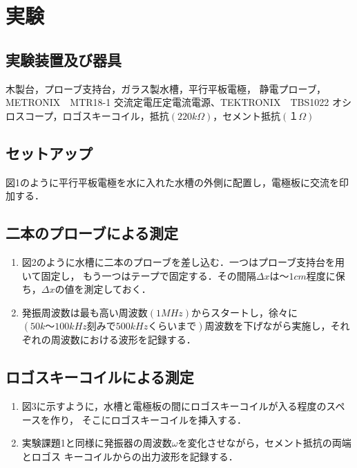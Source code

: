 
\section{実験}

\subsection{実験装置及び器具}
木製台，プローブ支持台，ガラス製水槽，平行平板電極，
静電プローブ，METRONIX　MTR18-1 交流定電圧定電流電源、TEKTRONIX　TBS1022
オシロスコープ，ロゴスキーコイル，抵抗$(220\si{k\Omega})$，セメント抵抗$(１\si{\Omega})$

\subsection{セットアップ}
図1のように平行平板電極を水に入れた水槽の外側に配置し，電極板に交流を印加する．

\subsection{二本のプローブによる測定}
\begin{enumerate}
    \item 図2のように水槽に二本のプローブを差し込む．一つはプローブ支持台を用いて固定し，
    もう一つはテープで固定する．その間隔$\Delta x$は～$1\si{cm}$程度に保ち，$\Delta x$の値を測定しておく．
    \item 発振周波数は最も高い周波数$(1\si{MHz})$からスタートし，徐々に$(50\si{k}～100\si{kHz} 刻みで
    500\si{kHz}くらいまで)$周波数を下げながら実施し，それぞれの周波数における波形を記録する．
    
\end{enumerate}

\subsection{ロゴスキーコイルによる測定}
\begin{enumerate}
    \item 図3に示すように，水槽と電極板の間にロゴスキーコイルが入る程度のスペースを作り，
    そこにロゴスキーコイルを挿入する．
    \item 実験課題1と同様に発振器の周波数$\omega$を変化させながら，セメント抵抗の両端とロゴス
    キーコイルからの出力波形を記録する．
\end{enumerate}